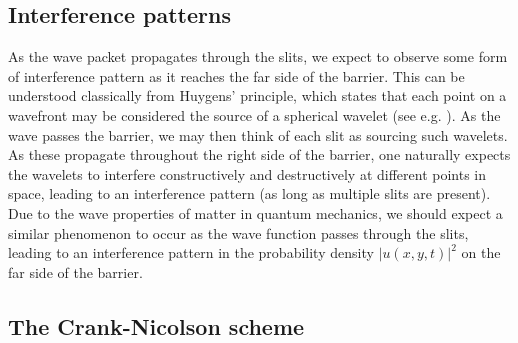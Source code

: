 \documentclass[aps,pra,reprint,amsmath,amssymb,twocolumn,preprintnumbers,superscriptaddress,10pt]{revtex4-2}
\begin{document}
\subsection{Interference patterns}  \label{sec:interference}
As the wave packet propagates through the slits, we expect to observe some form of interference pattern as it reaches the far side of the barrier.
This can be understood classically from Huygens' principle, which states that each point on a wavefront may be considered the source of a spherical wavelet (see e.g. \cite[421]{vistnes2018physics}).
As the wave passes the barrier, we may then think of each slit as sourcing such wavelets.
As these propagate throughout the right side of the barrier, one naturally expects the wavelets to interfere constructively and destructively at different points in space, leading to an interference pattern (as long as multiple slits are present).
Due to the wave properties of matter in quantum mechanics, we should expect a similar phenomenon to occur as the wave function passes through the slits, leading to an interference pattern in the probability density \(|u(x,y,t)|^2\) on the far side of the barrier.

\subsection{The Crank-Nicolson scheme}  \label{sec:Crank_Nicolson}
\end{document}
